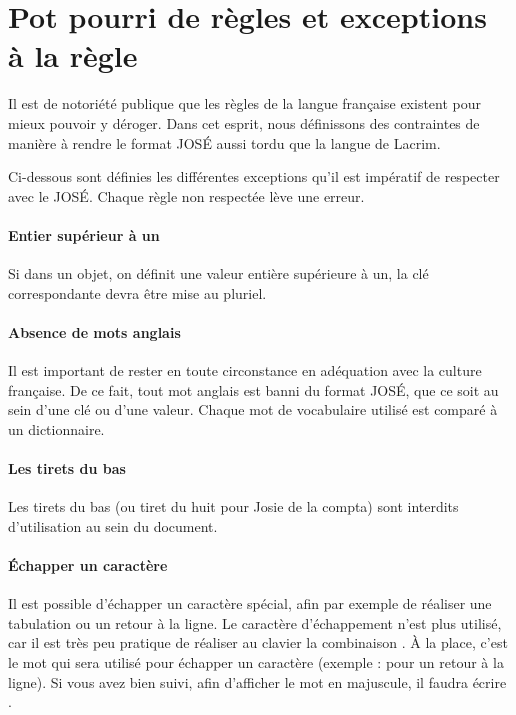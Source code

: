 \documentclass[french]{article}
\begin{document}
\section{Pot pourri de règles et exceptions à la règle} {
    Il est de notoriété publique que les règles de la langue française existent pour mieux pouvoir y déroger. Dans cet esprit, nous définissons des contraintes de manière à rendre le format JOSÉ aussi tordu que la langue de Lacrim.
    
    Ci-dessous sont définies les différentes exceptions qu'il est impératif de respecter avec le JOSÉ. Chaque règle non respectée lève une erreur.
    
    \paragraph{Entier supérieur à un} {
        Si dans un objet, on définit une valeur entière supérieure à un, la clé correspondante devra être mise au pluriel.
    }
    
    \paragraph{Absence de mots anglais} {
        Il est important de rester en toute circonstance en adéquation avec la culture française. De ce fait, tout mot anglais est banni du format JOSÉ, que ce soit au sein d'une clé ou d'une valeur. Chaque mot de vocabulaire utilisé est comparé à un dictionnaire.
    }
    
    \paragraph{Les tirets du bas} {
        Les tirets du bas (ou tiret du huit pour Josie de la compta) sont interdits d'utilisation au sein du document.
    }
    
    \paragraph{Échapper un caractère} {
        Il est possible d'échapper un caractère spécial, afin par exemple de réaliser une tabulation ou un retour à la ligne. Le caractère d'échappement \textquote{\textbackslash} n'est plus utilisé, car il est très peu pratique de réaliser au clavier la combinaison . À la place, c'est le mot  qui sera utilisé pour échapper un caractère (exemple :  pour un retour à la ligne). Si vous avez bien suivi, afin d'afficher le mot  en majuscule, il faudra écrire .
    }
}
\end{document}
